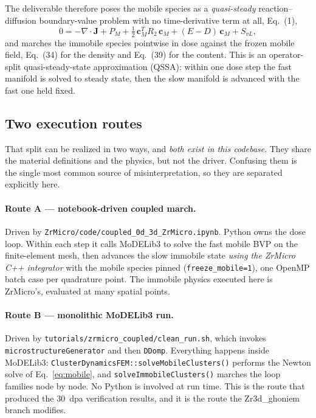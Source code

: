 \documentclass[11pt]{article}
\newcommand{\ZrM}{\textsf{ZrMicro}}
\newcommand{\MoD}{\textsf{MoDELib3}}
\newcommand{\Zrd}{\textsf{Zr3d\_ghoniem}}
\newcommand{\code}[1]{\texttt{\small #1}}
\newcommand{\file}[1]{\texttt{\footnotesize #1}}
\newcommand{\dref}[1]{Eq.~(#1)}
\begin{document}
The deliverable therefore poses the mobile species as a \emph{quasi-steady}
reaction--diffusion boundary-value problem with no time-derivative term at all,
\dref{1},
\begin{equation}
0 = -\nabla\!\cdot\!\boldsymbol{J} + P_M
    + \tfrac{1}{2}\,\boldsymbol{c}_M^{T} R_2\,\boldsymbol{c}_M
    + (E-D)\,\boldsymbol{c}_M + S_{vL},
\label{eq:mobile}
\end{equation}
and marches the immobile species pointwise in dose against the frozen mobile
field, \dref{34} for the density and \dref{39} for the content. This is an
operator-split quasi-steady-state approximation (QSSA): within one dose step the
fast manifold is solved to steady state, then the slow manifold is advanced with
the fast one held fixed.

\subsection{Two execution routes}

That split can be realized in two ways, and \emph{both exist in this codebase}.
They share the material definitions and the physics, but not the driver. Confusing
them is the single most common source of misinterpretation, so they are separated
explicitly here.

\paragraph*{Route A --- notebook-driven coupled march.}
Driven by \file{ZrMicro/code/coupled\_0d\_3d\_ZrMicro.ipynb}. Python owns the
dose loop. Within each step it calls \MoD{} to solve the fast mobile BVP on the
finite-element mesh, then advances the slow immobile state \emph{using the \ZrM{}
C++ integrator} with the mobile species pinned
(\code{freeze\_mobile=1}), one OpenMP batch case per quadrature point. The
immobile physics executed here is \ZrM{}'s, evaluated at many spatial points.

\paragraph*{Route B --- monolithic \MoD{} run.}
Driven by \file{tutorials/zrmicro\_coupled/clean\_run.sh}, which invokes
\code{microstructureGenerator} and then \code{DDomp}. Everything happens inside
\MoD{}: \code{ClusterDynamicsFEM::solveMobileClusters()} performs the Newton
solve of Eq.~\eqref{eq:mobile}, and \code{solveImmobileClusters()} marches the
loop families node by node. No Python is involved at run time. This is the route
that produced the 30~dpa verification results, and it is the route the \Zrd{}
branch modifies.
\end{document}
